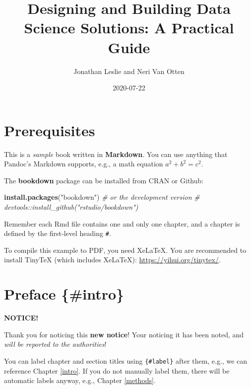 \documentclass[
]{book}
\title{Designing and Building Data Science Solutions: A Practical Guide}
\author{Jonathan Leslie and Neri Van Otten}
\date{2020-07-22}
\newenvironment{Shaded}{\begin{snugshade}}{\end{snugshade}}
\newcommand{\CommentTok}[1]{\textcolor[rgb]{0.56,0.35,0.01}{\textit{#1}}}
\newcommand{\KeywordTok}[1]{\textcolor[rgb]{0.13,0.29,0.53}{\textbf{#1}}}
\newcommand{\NormalTok}[1]{#1}
\newcommand{\StringTok}[1]{\textcolor[rgb]{0.31,0.60,0.02}{#1}}
\begin{document}
\maketitle

{
\setcounter{tocdepth}{1}
\tableofcontents
}
\hypertarget{prerequisites}{%
\chapter{Prerequisites}\label{prerequisites}}

This is a \emph{sample} book written in \textbf{Markdown}. You can use anything that Pandoc's Markdown supports, e.g., a math equation \(a^2 + b^2 = c^2\).

The \textbf{bookdown} package can be installed from CRAN or Github:

\begin{Shaded}
\begin{Highlighting}[]
\KeywordTok{install.packages}\NormalTok{(}\StringTok{"bookdown"}\NormalTok{)}
\CommentTok{# or the development version}
\CommentTok{# devtools::install_github("rstudio/bookdown")}
\end{Highlighting}
\end{Shaded}

Remember each Rmd file contains one and only one chapter, and a chapter is defined by the first-level heading \texttt{\#}.

To compile this example to PDF, you need XeLaTeX. You are recommended to install TinyTeX (which includes XeLaTeX): \url{https://yihui.org/tinytex/}.

\hypertarget{preface-intro}{%
\chapter*{Preface \{\#intro\}}\label{preface-intro}}

\begin{infobox}

\textbf{NOTICE!}

Thank you for noticing this \textbf{new notice}! Your noticing it has
been noted, and \emph{will be reported to the authorities}!

\end{infobox}

You can label chapter and section titles using \texttt{\{\#label\}} after them, e.g., we can reference Chapter \ref{intro}. If you do not manually label them, there will be automatic labels anyway, e.g., Chapter \ref{methods}.
\end{document}
